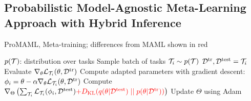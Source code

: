 \documentclass{article}
\begin{document}
\subsection{Probabilistic Model-Agnostic Meta-Learning Approach with Hybrid Inference}
\vspace{-0.2cm}


\iffalse
\begin{algorithm}[h]
    \caption{Model-Agnostic Meta-Learning~\cite{finn2017model}}
    \small
    \label{alg:maml}
    \begin{algorithmic}[1]
    \Require $p(\task)$: distribution over tasks
    \Require $\alpha$: step size hyperparameter
    \State randomly initialize $\theta$
    \While{not done}
    \State Sample batch of tasks $\task_i \sim p(\task)$
      \ForAll{$\task_i$}
    \State $\metatrain, \metaval = \task_i$
     \State Evaluate $\nabla_\theta \lossi(\theta, \metatrain)$
     \State Compute adapted parameters with gradient descent: $\phi_i=\theta-\alpha \nabla_\theta  \lossi( \theta, \metatrain)$
     \EndFor
     \State Compute $ \nabla_\theta \sum_{\task_i}  \lossi (\phi_i, \metaval)$
     \State Update $\theta$ using Adam
    \EndWhile
\end{algorithmic}
\end{algorithm}
\fi


\iffalse
\begin{algorithm}[h]
    \caption{ProMAML, Meta-training; differences from MAML shown in red}
    \small
    \label{alg:promaml}
    \begin{algorithmic}[1]
    \Require $p(\task)$: distribution over tasks
\State {}
    \State Sample batch of tasks $\task_i \sim p(\task)$
     \State $\metatrain, \metaval = \task_i$
     \State {}
\State {}
\State Evaluate $\nabla_\theta \lossi(\theta, \metatrain)$
\State Compute adapted parameters with gradient descent: $\phi_i =\theta-\alpha \nabla_\theta \lossi(\theta, \metatrain)$
     \EndFor
\State {}
     \State Compute $\nabla_\Theta \left( \sum_{\mathcal{T}_i}  \mathcal{L}_{\mathcal{T}_i} ( \phi_i, \mathcal{D}^\text{test}) \textcolor{red}{+ D_\text{KL}(q(\theta | \mathcal{D}^\text{test}) \mid\mid p(\theta | \mathcal{D}^\text{tr}))  } \right)$
     \State Update $\Theta$ using Adam
    \EndWhile
\end{algorithmic}
\end{algorithm}
\end{document}
